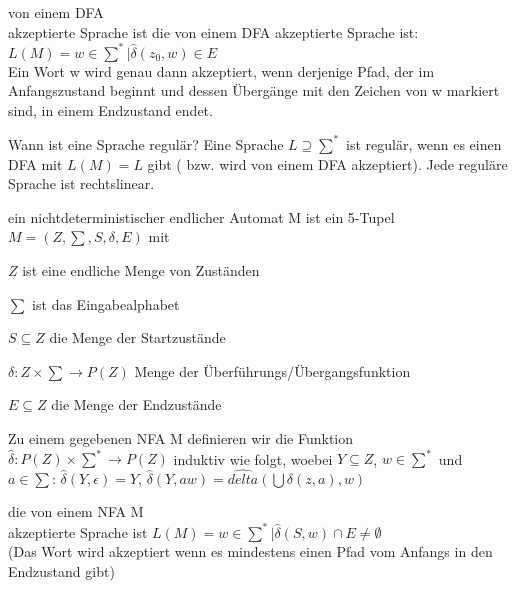\documentclass[avery5371, frame]{flashcards}
\begin{document}
\begin{flashcard}[Definition]{von einem DFA \\akzeptierte Sprache ist}
    die von einem DFA akzeptierte Sprache ist: $L(M)={w\in\sum^* | \hat{\delta}(z_0,w)\in E}$\\
    Ein Wort w wird genau dann akzeptiert, wenn derjenige Pfad, der im Anfangszustand beginnt und dessen Übergänge mit den Zeichen von w markiert sind, in einem Endzustand endet.
\end{flashcard}

\begin{flashcard}[Definition]{Wann ist eine Sprache regulär?}
    Eine Sprache $L \supseteq \sum^*$ ist regulär, wenn es einen DFA mit $L(M)=L$ gibt ( bzw. wird von einem DFA akzeptiert).  Jede reguläre Sprache ist rechtslinear.
\end{flashcard}

\begin{flashcard}[Definition]{ ein nichtdeterministischer endlicher Automat M}
    ist ein 5-Tupel $M=(Z,\sum,S,\delta,E)$ mit
    \begin{itemize*}
        \item $Z$ ist eine endliche Menge von Zuständen
        \item $\sum$ ist das Eingabealphabet
        \item $S\subseteq Z$ die Menge der Startzustände
        \item $\delta: Z \times \sum \rightarrow P(Z)$ Menge der Überführungs/Übergangsfunktion
        \item $E\subseteq Z$ die Menge der Endzustände
    \end{itemize*}
\end{flashcard}

\begin{flashcard}[Definition]{ Zu einem gegebenen NFA M definieren wir die Funktion $\hat{\delta}:P(Z)\times \sum^* \rightarrow P(Z)$}
    induktiv wie folgt, woebei $Y \subseteq Z$, $w\in \sum^*$ und \\
    $a\in\sum$: $\hat{\delta}(Y,\epsilon)=Y$, $\hat{\delta}(Y,aw)=\hat{delta}(\bigcup \delta(z,a),w)$
\end{flashcard}

\begin{flashcard}[Definition]{ die von einem NFA M \\akzeptierte Sprache ist}
    $L(M)={w\in \sum^* | \hat{\delta}(S,w)\cap E \not = \emptyset}$ \\
    (Das Wort wird akzeptiert wenn es mindestens einen Pfad vom Anfangs in den Endzustand gibt)
\end{flashcard}
\end{document}

